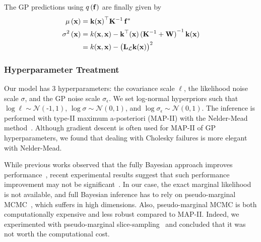The GP predictions using \(q\,(\mathbf{f})\) are finally given by
\begin{align*}
  \mu\,(\mathbf{x})
  &= {\mathbf{k}(\mathbf{x})}^{\top} \mathbf{K}^{-1} \, \mathbf{f}^*  \\
  \sigma^2\,(\mathbf{x})
  &= k(\mathbf{x}, \mathbf{x}) - \mathbf{k}^{\top}(\mathbf{x}) \, {(\mathbf{K}^{-1} + \mathbf{W})}^{-1} \, \mathbf{k}(\mathbf{x}) \\
  &= k(\mathbf{x}, \mathbf{x}) - {\big( \mathbf{L}_{\mathcal{L}} \mathbf{k}(\mathbf{x}) \big)}^2
\end{align*}

\subsubsection{Hyperparameter Treatment}
Our model has 3 hyperparameters: the covariance scale \(\ell\), the likelihood noise scale \(\sigma\), and the GP noise scale \(\sigma_\epsilon\).
We set log-normal hyperpriors such that \(\log \ell \sim \mathcal{N}\left(\text{-}1, 1\right)\), \(\log \sigma \sim \mathcal{N}\left(0, 1\right)\), and \(\log \sigma_{\epsilon} \sim \mathcal{N}\left(0, 1\right)\).
The inference is performed with type-II maximum a-posteriori (MAP-II) with the Nelder-Mead method~\cite{nelder_simplex_1965}.
Although gradient descent is often used for MAP-II of GP hyperparameters, we found that dealing with Cholesky failures is more elegant with Nelder-Mead.

While previous works observed that the fully Bayesian approach improves performance~\cite{henrandez-lobato_predictive_2014, snoek_practical_2012}, recent experimental results suggest that such performance improvement may not be significant~\cite{ath_bayesian_2021}.
In our case, the exact marginal likelihood is not available, and full Bayesian inference has to rely on pseudo-marginal MCMC~\cite{filippone_pseudomarginal_2014, pmlr-v51-murray16}, which suffers in high dimensions.
Also, pseudo-marginal MCMC is both computationally expensive and less robust compared to MAP-II.
Indeed, we experimented with pseudo-marginal slice-sampling~\cite{pmlr-v51-murray16} and concluded that it was not worth the computational cost.



